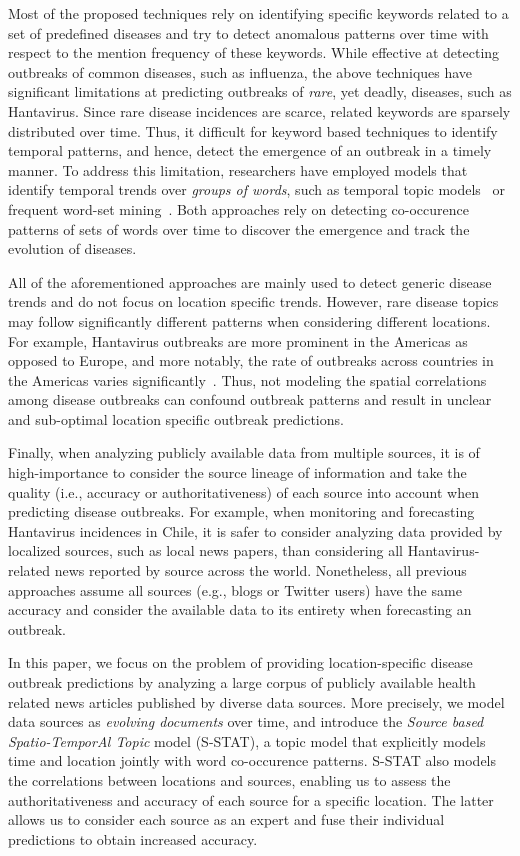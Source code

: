 \documentclass{sig-alternate}
\newcommand{\model}{{S-STAT}\xspace} %
\begin{document}
Most of the proposed techniques rely on identifying specific keywords related to a set of predefined diseases and try to detect anomalous patterns over time with respect to the mention frequency of these keywords. While effective at detecting outbreaks of common diseases, such as influenza, the above techniques have significant limitations at predicting outbreaks of {\em rare}, yet deadly, diseases, such as Hantavirus. Since rare disease incidences are scarce, related keywords are sparsely distributed over time. Thus, it difficult for keyword based techniques to identify temporal patterns, and hence, detect the emergence of an outbreak in a timely manner. To address this limitation, researchers have employed models that identify temporal trends over {\em groups of words}, such as temporal topic models~\cite{paul:11} or frequent word-set mining~\cite{parker:13}. Both approaches rely on detecting co-occurence patterns of sets of words over time to discover the emergence and track the evolution of diseases. 

All of the aforementioned approaches are mainly used to detect generic disease trends and do not focus on location specific trends. However, rare disease topics may follow significantly different patterns when considering different locations. For example, Hantavirus outbreaks are more prominent in the Americas as opposed to Europe, and more notably, the rate of outbreaks across countries in the Americas varies significantly~\cite{jonsson:10}. Thus, not modeling the spatial correlations among disease outbreaks can confound outbreak patterns and result in unclear and sub-optimal location specific outbreak predictions. 

Finally, when analyzing publicly available data from multiple sources, it is of high-importance to consider the source lineage of information and take the quality (i.e., accuracy or authoritativeness) of each source into account when predicting disease outbreaks. For example, when monitoring and forecasting Hantavirus incidences in Chile, it is safer to consider analyzing data provided by localized sources, such as local news papers, than considering all Hantavirus-related news reported by source across the world. Nonetheless, all previous approaches assume all sources (e.g., blogs or Twitter users) have the same accuracy and consider the available data to its entirety when forecasting an outbreak. 

In this paper, we focus on the problem of providing location-specific disease outbreak predictions by analyzing a large corpus of publicly available health related news articles published by diverse data sources. More precisely, we model data sources as {\em evolving documents} over time, and introduce the {\em Source based Spatio-TemporAl Topic} model (\model), a topic  model that explicitly models time and location jointly with word co-occurence patterns. \model also models the correlations between locations and sources, enabling us to assess the authoritativeness and accuracy of each source for a specific location. The latter allows us to consider each source as an expert and fuse their individual predictions to obtain increased accuracy. 
\end{document}
